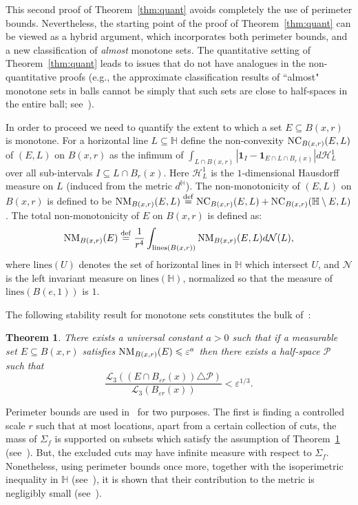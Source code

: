 \documentclass{icm2010}
\newtheorem{theorem}{Theorem}[section]
\theoremstyle{definition}
\newcommand{\eqdef}{\stackrel{\mathrm{def}}{=}}
\newcommand{\1}{\mathbf{1}}
\renewcommand{\H}{\mathbb{H}}
\renewcommand{\le}{\leqslant}
\newcommand{\e}{\varepsilon}
\begin{document}
This second proof of Theorem~\ref{thm:quant} avoids completely the
use of perimeter bounds. Nevertheless, the starting point of the
proof of Theorem~\ref{thm:quant} can be viewed as a hybrid argument,
which incorporates both perimeter bounds, and a new classification
of {\em almost} monotone sets. The quantitative setting of
Theorem~\ref{thm:quant} leads to issues that do not have analogues
in the non-quantitative proofs (e.g., the approximate classification
results of ``almost" monotone sets in balls cannot be simply that
such sets are close to half-spaces in the entire ball;
see~\cite[Example\ 9.1]{ckn}).

In order to proceed we need to quantify the extent to which a set
$E\subseteq B(x,r)$ is monotone. For a horizontal line $L\subseteq
\H$ define the non-convexity ${\rm NC}_{B(x,r)}(E,L)$ of $(E,L)$ on
$B(x,r)$ as the infimum of $\int_{L\cap B(x,r)}\left|\1_I-\1_{E\cap
L\cap B_r(x)}\right|d\mathcal H_L^1$ over all sub-intervals
$I\subseteq L\cap B_r(x)$. Here $\mathcal H_L^1$ is the
$1$-dimensional Hausdorff measure on $L$ (induced from the metric
$d^\H$). The non-monotonicity of $(E,L)$ on $B(x,r)$ is defined to
be ${\rm NM}_{B(x,r)}(E,L)\eqdef {\rm NC}_{B(x,r)}(E,L)+{\rm
NC}_{B(x,r)}(\H\setminus E,L)$. The total non-monotonicity of $E$ on
$B(x,r)$ is defined as:
\begin{equation*}
{\rm NM}_{B(x,r)}(E)\eqdef
\frac{1}{r^4}\int_{\mathrm{lines}(B(x,r))}{\rm
NM}_{B(x,r)}(E,L)d\mathcal{N}(L),
\end{equation*}
where $\mathrm{lines}(U)$ denotes the set of horizontal lines in
$\H$ which intersect $U$, and $\mathcal N$ is the left invariant
measure on $\mathrm{lines} (\H)$, normalized so that the measure of
$\mathrm{lines}(B(e,1))$ is $1$.

The following stability result for monotone sets constitutes the
bulk of~\cite{ckn}:
\begin{theorem}\label{thm:stability}
There exists a universal constant $a>0$ such that if a measurable
set $E\subseteq B(x,r)$ satisfies ${\rm NM}_{B(x,r)}(E)\le \e^a$
then there exists a half-space $\mathcal P$ such that
$$
\frac{\mathscr{L}_3\left((E\cap B_{\e r}(x))\triangle \mathcal
P\right)}{\mathscr{L}_3(B_{\e r}(x))}<\e^{1/3}.
$$
\end{theorem}
Perimeter bounds are used in~\cite{ckn,CKN09} for two purposes. The
first is finding a controlled scale $r$ such that at most locations,
apart from a certain collection of cuts, the mass of $\Sigma_f$ is
supported on subsets which satisfy the assumption of
Theorem~\ref{thm:stability} (see~\cite[Sec.\ 9]{CKN09}). But, the
excluded cuts may have infinite measure with respect to
$\Sigma_f$. Nonetheless, using perimeter bounds once more, together
with the isoperimetric inequality in $\H$ (see~\cite{Pan82,CDF94}),
it is shown that their contribution to the metric is negligibly
small (see~\cite[Sec.\ 8]{CKN09}).
\end{document}
